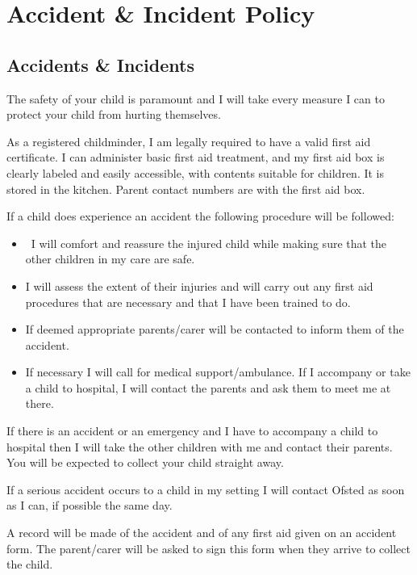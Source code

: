 

\section{Accident \& Incident Policy}

\subsection{Accidents \& Incidents}

The safety of your child is paramount and I will take every measure I
can to protect your child from hurting themselves.

As a registered childminder, I am legally required to have a valid first
aid certificate. I can administer basic first aid treatment, and my
first aid box is clearly labeled and easily accessible, with contents
suitable for children. It is stored in the kitchen. Parent contact
numbers are with the first aid box.

If a child does experience an accident the following procedure will be
followed:

\begin{itemize}
\item
  ~I will comfort and reassure the injured child while making sure that
  the other children in my care are safe.~
\item
  I will assess the extent of their injuries and will carry out any
  first aid procedures that are necessary and that I have been trained
  to do.~
\item
  If deemed appropriate parents/carer will be contacted to inform them
  of the accident.~
\item
  If necessary I will call for medical support/ambulance. If I
  accompany or take a child to hospital, I will contact the parents and
  ask them to meet me at there.~
\end{itemize}

If there is an accident or an emergency and I have to accompany a child
to hospital then I will take the other children with me and contact
their parents. You will be expected to collect your child straight away.

If a serious accident occurs to a child in my setting I will contact
Ofsted as soon as I can, if possible the same day.

A record will be made of the accident and of any first aid given on an
accident form. The parent/carer will be asked to sign this form when
they arrive to collect the child. 

